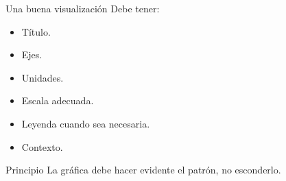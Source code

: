 \documentclass[aspectratio=169,11pt]{beamer}
\begin{document}
\begin{frame}{Una buena visualización}
Debe tener:
\begin{itemize}
    \item Título.
    \item Ejes.
    \item Unidades.
    \item Escala adecuada.
    \item Leyenda cuando sea necesaria.
    \item Contexto.
\end{itemize}
\begin{alertblock}{Principio}
La gráfica debe hacer evidente el patrón, no esconderlo.
\end{alertblock}
\end{frame}
\end{document}
